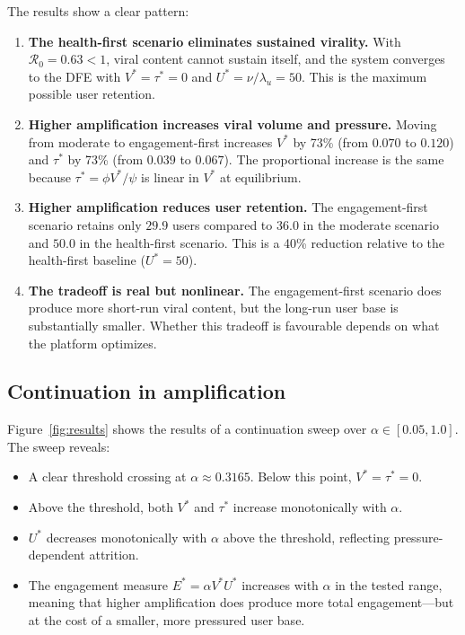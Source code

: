 \documentclass[11pt]{article}
\begin{document}
The results show a clear pattern:
\begin{enumerate}[leftmargin=1.5em]
    \item \textbf{The health-first scenario eliminates sustained virality.} With $\mathcal{R}_0 = 0.63 < 1$, viral content cannot sustain itself, and the system converges to the DFE with $V^* = \tau^* = 0$ and $U^* = \nu/\lambda_u = 50$. This is the maximum possible user retention.

    \item \textbf{Higher amplification increases viral volume and pressure.} Moving from moderate to engagement-first increases $V^*$ by 73\% (from $0.070$ to $0.120$) and $\tau^*$ by 73\% (from $0.039$ to $0.067$). The proportional increase is the same because $\tau^* = \phi V^*/\psi$ is linear in $V^*$ at equilibrium.

    \item \textbf{Higher amplification reduces user retention.} The engagement-first scenario retains only $29.9$ users compared to $36.0$ in the moderate scenario and $50.0$ in the health-first scenario. This is a 40\% reduction relative to the health-first baseline ($U^* = 50$).

    \item \textbf{The tradeoff is real but nonlinear.} The engagement-first scenario does produce more short-run viral content, but the long-run user base is substantially smaller. Whether this tradeoff is favourable depends on what the platform optimizes.
\end{enumerate}

\subsection{Continuation in amplification}

Figure~\ref{fig:results} shows the results of a continuation sweep over $\alpha \in [0.05, 1.0]$. The sweep reveals:
\begin{itemize}[leftmargin=1.5em]
    \item A clear threshold crossing at $\alpha \approx 0.3165$. Below this point, $V^* = \tau^* = 0$.
    \item Above the threshold, both $V^*$ and $\tau^*$ increase monotonically with $\alpha$.
    \item $U^*$ decreases monotonically with $\alpha$ above the threshold, reflecting pressure-dependent attrition.
    \item The engagement measure $E^* = \alpha V^* U^*$ increases with $\alpha$ in the tested range, meaning that higher amplification does produce more total engagement---but at the cost of a smaller, more pressured user base.
\end{itemize}
\end{document}
